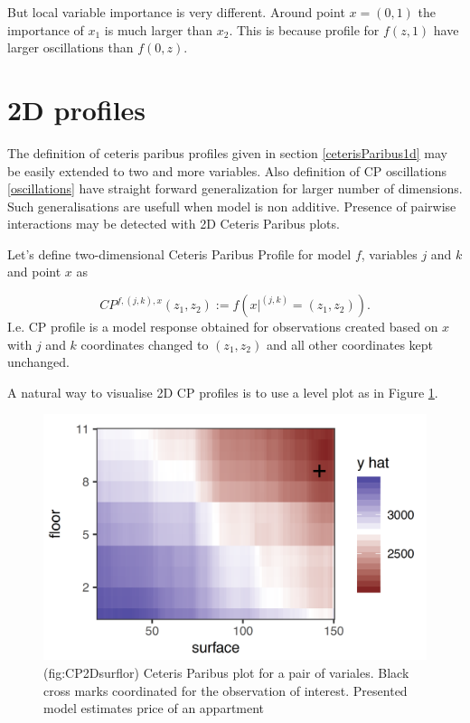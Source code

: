 \documentclass[]{book}
\theoremstyle{definition}
\theoremstyle{definition}
\theoremstyle{definition}
\theoremstyle{remark}
\begin{document}
But local variable importance is very different. Around point
\(x = (0, 1)\) the importance of \(x_1\) is much larger than \(x_2\).
This is because profile for \(f(z, 1)\) have larger oscillations than
\(f(0, z)\).

\hypertarget{d-profiles}{%
\section{2D profiles}\label{d-profiles}}

The definition of ceteris paribus profiles given in section
\ref{ceterisParibus1d} may be easily extended to two and more variables.
Also definition of CP oscillations \ref{oscillations} have straight
forward generalization for larger number of dimensions. Such
generalisations are usefull when model is non additive. Presence of
pairwise interactions may be detected with 2D Ceteris Paribus plots.

Let's define two-dimensional Ceteris Paribus Profile for model \(f\),
variables \(j\) and \(k\) and point \(x\) as

\[
CP^{f, (j,k), x}(z_1, z_2) := f(x|^{(j,k)} = (z_1,z_2)).
\] I.e. CP profile is a model response obtained for observations created
based on \(x\) with \(j\) and \(k\) coordinates changed to
\((z_1, z_2)\) and all other coordinates kept unchanged.

A natural way to visualise 2D CP profiles is to use a level plot as in
Figure \ref{fig:CP2Dsurflor}.

\begin{figure}

{\centering \includegraphics[width=0.6\linewidth]{figure/cp_2d_surf_floor} 

}

\caption{(fig:CP2Dsurflor) Ceteris Paribus plot for a pair of variales. Black cross marks coordinated for the observation of interest. Presented model estimates price of an appartment}\label{fig:CP2Dsurflor}
\end{figure}
\end{document}
